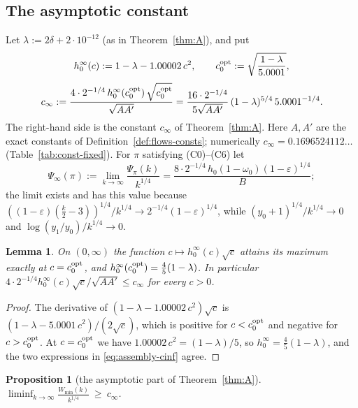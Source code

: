 \documentclass[11pt]{amsart}
\newcommand{\eps}{\varepsilon}
\newtheorem{proposition}[theorem]{Proposition}
\newtheorem{lemma}[theorem]{Lemma}
\theoremstyle{definition}
\theoremstyle{remark}
\numberwithin{equation}{section}
\begin{document}
\subsection{The asymptotic constant}\label{subsec:assembly-asym}

Let $\lambda:=2\delta+2\cdot10^{-12}$ (as in Theorem~\ref{thm:A}), and put
\[
h_0^\infty(c):=1-\lambda-1.00002\,c^2,\qquad c_0^{\rm opt}:=\sqrt{\frac{1-\lambda}{5.0001}},
\]
\begin{equation}\label{eq:assembly-cinf}
c_\infty:=\frac{4\cdot2^{-1/4}\,h_0^\infty(c_0^{\rm opt})\,\sqrt{c_0^{\rm opt}}}{\sqrt{AA'}}
=\frac{16\cdot2^{-1/4}}{5\sqrt{AA'}}\,(1-\lambda)^{5/4}\,5.0001^{-1/4}.
\end{equation}
The right-hand side is the constant $c_\infty$ of Theorem~\ref{thm:A}. Here $A,A'$ are the exact constants of
Definition~\ref{def:flows-consts}; numerically $c_\infty=0.1696524112\ldots$ (Table~\ref{tab:const-fixed}). For $\pi$
satisfying (C0)--(C6) let
\[
\Psi_\infty(\pi):=\lim_{k\to\infty}\frac{\Psi_\pi(k)}{k^{1/4}}=\frac{8\cdot2^{-1/4}\,h_0(1-\omega_0)(1-\eps)^{1/4}}{B};
\]
the limit exists and has this value because $((1-\eps)(\frac k2-3))^{1/4}/k^{1/4}\to2^{-1/4}(1-\eps)^{1/4}$, while
$(y_0+1)^{1/4}/k^{1/4}\to0$ and $\log(y_1/y_0)/k^{1/4}\to0$.

\begin{lemma}\label{lem:assembly-c0}
On $(0,\infty)$ the function $c\mapsto h_0^\infty(c)\sqrt c$ attains its maximum exactly at $c=c_0^{\rm opt}$, and
$h_0^\infty(c_0^{\rm opt})=\frac45(1-\lambda)$. In particular $4\cdot2^{-1/4}h_0^\infty(c)\sqrt c/\sqrt{AA'}\le c_\infty$
for every $c>0$.
\end{lemma}

\begin{proof}
The derivative of $(1-\lambda-1.00002\,c^2)\sqrt c$ is $(1-\lambda-5.0001\,c^2)/(2\sqrt c)$, which is positive for
$c<c_0^{\rm opt}$ and negative for $c>c_0^{\rm opt}$. At $c=c_0^{\rm opt}$ we have
$1.00002\,c^2=(1-\lambda)/5$, so $h_0^\infty=\frac45(1-\lambda)$, and the two expressions in \eqref{eq:assembly-cinf}
agree.
\end{proof}

\begin{proposition}[the asymptotic part of Theorem~\ref{thm:A}]\label{prop:assembly-liminf}
$\displaystyle\liminf_{k\to\infty}\frac{W_{\min}(k)}{k^{1/4}}\ \ge\ c_\infty$.
\end{proposition}
\end{document}
